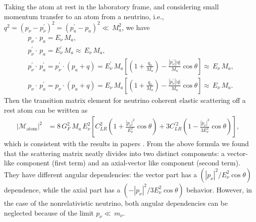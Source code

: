 Taking the atom at rest in the laboratory frame, and considering small momentum transfer to an atom from a neutrino, i.e., $q^2=(p_\nu-p^\prime_\nu)^2=(p_a^\prime-p_a)^2\ll\,M^2_a$, we have
\begin{align}
&p_\nu\cdot\,p_a=E_\nu\,M_a,\\
&p_\nu^\prime\cdot\,p_a=E_\nu^\prime\,M_a\approx\,E_\nu\,M_a,\\
&p^\prime_\nu\cdot\,p^\prime_a=p^\prime_\nu\cdot(p_a+q)=E^\prime_\nu\,M_a\left[\left(1+\frac{q_0}{M_a}\right)-\frac{|p^\prime_\nu||q|}{M_a}\cos\theta\right]\approx\,E_\nu\,M_a,\\
&p_\nu\cdot\,p^\prime_a=p_\nu\cdot(p_a+q)=E_\nu\,M_a\left[\left(1+\frac{q_0}{M_a}\right)-\frac{|p^\prime_\nu||q|}{M_a}\cos\theta\right]\approx\,E_\nu\,M_a.
\end{align}
Then the transition matrix element for neutrino coherent elastic scattering off a rest atom can be written as
\begin{align}\label{M_general}
|\mathcal{M}_{\mathrm{atom}}|^2&=8\,G^2_F\,M_a\,E_\nu^2\left[C^2_{LR}\left(1+\frac{|p_\nu|^2}{E^2_\nu}\cos\theta\right)+3C^{\prime2}_{LR}\left(1-\frac{|p_\nu|^2}{3E_\nu^2}\cos\theta\right)\right],
\end{align}
which is consistent with the results in papers \cite{PhysRevD.38.32,Lewis:1979mu,Papavassiliou:2005cs,Smith:1984gym}.
From the above formula we found that the scattering matrix neatly divides into two distinct components: a vector-like component (first term) and an axial-vector like component (second term). They have different angular dependencies: the vector part has a $\left({|p_\nu|^2}/{E^2_\nu}\cos\theta\right)$ dependence, while the axial part has a $\left(-{|p_\nu|^2}/{3E_\nu^2}\cos\theta\right)$ behavior. However, in the case of the nonrelativistic neutrino, both angular dependencies can be neglected because of the limit $p_\nu\ll\,m_\nu$. 

